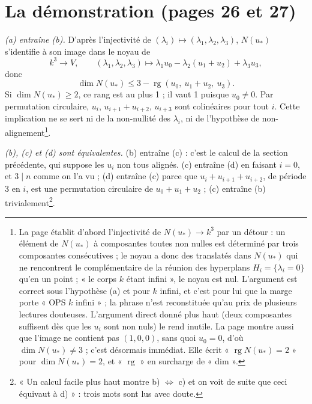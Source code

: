 \documentclass[11pt,a4paper]{article}
\begin{document}
\section*{La démonstration (pages 26 et 27)}

\emph{(a) entraîne (b).} D'après l'injectivité de
$(\lambda_i) \mapsto (\lambda_1, \lambda_2, \lambda_3)$, $N(u_*)$ s'identifie à
son image dans le noyau de
\[
  k^3 \longrightarrow V, \qquad (\lambda_1, \lambda_2, \lambda_3) \longmapsto
  \lambda_1 u_0 - \lambda_2 (u_1 + u_2) + \lambda_3 u_3 ,
\]
donc
\[
  \dim N(u_*) \leqslant 3 - \operatorname{rg}(u_0,\ u_1 + u_2,\ u_3) .
\]
Si $\dim N(u_*) \geqslant 2$, ce rang est au plus 1 ; il vaut 1 puisque
$u_0 \neq 0$. Par permutation circulaire, $u_i$, $u_{i+1} + u_{i+2}$, $u_{i+3}$
sont colinéaires pour tout $i$. Cette implication ne se sert ni de la
non-nullité des $\lambda_i$, ni de l'hypothèse de non-alignement\footnote{La
page établit d'abord l'injectivité de $N(u_*) \to k^3$ par un détour : un
élément de $N(u_*)$ à composantes toutes non nulles est déterminé par trois
composantes consécutives ; le noyau a donc des translatés dans $N(u_*)$ qui ne
rencontrent le complémentaire de la réunion des hyperplans
$H_i = \{\lambda_i = 0\}$ qu'en un point ; « le corps $k$ étant infini », le
noyau est nul. L'argument est correct sous l'hypothèse (a) et pour $k$ infini,
et c'est pour lui que la marge porte « OPS $k$ infini » ; la phrase n'est
reconstituée qu'au prix de plusieurs lectures douteuses. L'argument direct
donné plus haut (deux composantes suffisent dès que les $u_i$ sont non nuls)
le rend inutile. La page montre aussi que l'image ne contient pas
$(1, 0, 0)$, sans quoi $u_0 = 0$, d'où $\dim N(u_*) \neq 3$ ; c'est
désormais immédiat. Elle écrit « $\operatorname{rg} N(u_*) = 2$ » pour
$\dim N(u_*) = 2$, et « $\operatorname{rg}$ » en surcharge de « dim ».}.

\emph{(b), (c) et (d) sont équivalentes.} (b) entraîne (c) : c'est le calcul
de la section précédente, qui suppose les $u_i$ non tous alignés. (c) entraîne
(d) en faisant $i = 0$, et $3 \mid n$ comme on l'a vu ; (d) entraîne (c) parce
que $u_i + u_{i+1} + u_{i+2}$, de période 3 en $i$, est une permutation
circulaire de $u_0 + u_1 + u_2$ ; (c) entraîne (b) trivialement\footnote{« Un
calcul facile plus haut montre b) $\Leftrightarrow$ c) et on voit de suite que
ceci équivaut à d) » : trois mots sont lus avec doute.}.
\end{document}
